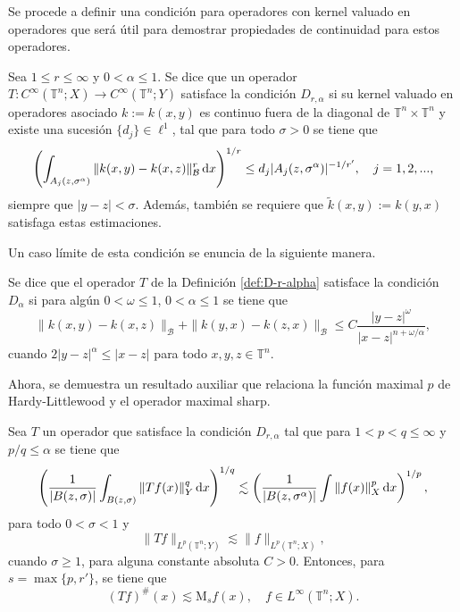 Se procede a definir una condición para operadores con kernel valuado en operadores que será útil para demostrar propiedades de continuidad para estos operadores.
\begin{definition} Sea $1\leq r\leq\infty$ y $0<\alpha\leq1$. Se dice que un operador $T:C^\infty(\mathbb{T}^n;X)\rightarrow C^\infty(\mathbb{T}^n;Y)$ satisface la condición $D_{r,\alpha}$ si su kernel valuado en operadores asociado $k:=k(x,y)$ es continuo fuera de la diagonal de $\mathbb{T}^n\times\mathbb{T}^n$ y existe una sucesión $\{d_j\}\in \ell^1$, tal que para todo $\sigma>0$ se tiene que 
	\begin{equation*}
		\left( \int_{A_j(z,\sigma^\alpha)} \|k(x, y) - k(x, z)\|^r_\mathcal{B} \mathop{}\!\mathrm{d} x \right)^{1/r} \leq d_j|A_j(z,\sigma^\alpha)|^{-1/r'}, \quad j=1,2,... ,
	\end{equation*}
	siempre que $|y-z|<\sigma$. Además, también se requiere que $\tilde{k}(x, y) := k(y, x)$ satisfaga estas estimaciones.
	\label{def:D-r-alpha}
\end{definition}
Un caso límite de esta condición se enuncia de la siguiente manera.
\begin{remark}
	Se dice que el operador $T$ de la Definición \ref{def:D-r-alpha} satisface la condición $D_\alpha$ si para algún $0<\omega\leq1$, $0<\alpha\leq1$ se tiene que
	\begin{equation*}
		\|k(x,y)-k(x, z)\|_\mathcal{B}+\|k(y, x)-k(z, x)\|_\mathcal{B} \leq C \frac{|y-z|^\omega}{|x-z|^{n+\omega/\alpha}},
	\end{equation*}
	cuando $2|y-z|^\alpha \leq |x - z|$ para todo $x, y, z\in \mathbb{T}^n$. 
	\label{rem:D-alpha-condition}
\end{remark}
Ahora, se demuestra un resultado auxiliar que relaciona la función maximal $p$ de Hardy-Littlewood y el operador maximal sharp.
\begin{theorem}
	Sea $T$ un operador que satisface la condición $D_{r,\alpha}$ tal que para $1<p<q\leq\infty$ y $p/q\leq\alpha$ se tiene que
	\begin{equation}
		\left( \frac{1}{|B(z, \sigma)|} \int_{B(z, \sigma)} \|Tf(x)\|_Y^q \mathop{}\!\mathrm{d} x  \right)^{1/q} \lesssim \left( \frac{1}{|B(z, \sigma^\alpha)|} \int \|f(x)\|_X^p \mathop{}\!\mathrm{d} x  \right)^{1/p}, 
		\label{eq:c-p-q-alpha}
	\end{equation}
	para todo $0<\sigma<1$ y 
	\begin{equation*}
		\|Tf\|_{L^p(\mathbb{T}^n;Y)} \lesssim \|f\|_{L^p(\mathbb{T}^n;X)},
	\end{equation*}
	cuando $\sigma\geq1$, para alguna constante absoluta $C>0$. Entonces, para $s=\max \{ p, r' \}$, se tiene que 
	\begin{equation}
		(Tf)^\#(x) \lesssim \mathrm{M}_sf(x), \quad f\in L^\infty (\mathbb{T}^n; X).
		\label{eq:Tf-Msf}
	\end{equation}
	\label{theo:Tf-Msf}
\end{theorem}
